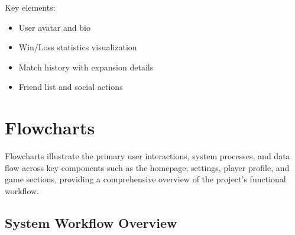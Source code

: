 \documentclass[11pt,a4paper]{report}
\begin{document}
Key elements:
\begin{itemize}
  \item User avatar and bio
  \item Win/Loss statistics visualization
  \item Match history with expansion details
  \item Friend list and social actions
\end{itemize}

\pagebreak

\section{Flowcharts}
\label{sec:flowcharts}

Flowcharts illustrate the primary user interactions, system processes, and data flow across key components such as the homepage, settings, player profile, and game sections, providing a comprehensive overview of the project's functional workflow.

\subsection{System Workflow Overview}
\end{document}
